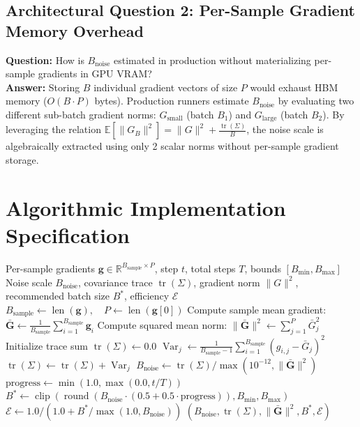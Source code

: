 \documentclass[11pt,a4paper]{article}
\theoremstyle{definition}
\begin{document}
\subsection{Architectural Question 2: Per-Sample Gradient Memory Overhead}
\textbf{Question:} How is $B_{\text{noise}}$ estimated in production without materializing per-sample gradients in GPU VRAM?\\
\textbf{Answer:} Storing $B$ individual gradient vectors of size $P$ would exhaust HBM memory ($O(B \cdot P)$ bytes). Production runners estimate $B_{\text{noise}}$ by evaluating two different sub-batch gradient norms: $G_{\text{small}}$ (batch $B_1$) and $G_{\text{large}}$ (batch $B_2$). By leveraging the relation $\mathbb{E}[\|G_B\|^2] = \|G\|^2 + \frac{\operatorname{tr}(\Sigma)}{B}$, the noise scale is algebraically extracted using only 2 scalar norms without per-sample gradient storage.

\section{Algorithmic Implementation Specification}

\begin{algorithm}[H]
\caption{Critical Batch Size and Gradient Noise Scale Estimation}
\begin{algorithmic}[1]
\Require Per-sample gradients $\mathbf{g} \in \mathbb{R}^{B_{\text{sample}} \times P}$, step $t$, total steps $T$, bounds $[B_{\min}, B_{\max}]$
\Ensure Noise scale $B_{\text{noise}}$, covariance trace $\operatorname{tr}(\Sigma)$, gradient norm $\|G\|^2$, recommended batch size $B^*$, efficiency $\mathcal{E}$
\State $B_{\text{sample}} \gets \operatorname{len}(\mathbf{g}), \quad P \gets \operatorname{len}(\mathbf{g}[0])$
\State Compute sample mean gradient: $\bar{\mathbf{G}} \gets \frac{1}{B_{\text{sample}}} \sum_{i=1}^{B_{\text{sample}}} \mathbf{g}_i$
\State Compute squared mean norm: $\|\bar{\mathbf{G}}\|^2 \gets \sum_{j=1}^P \bar{G}_j^2$
\State Initialize trace sum $\operatorname{tr}(\Sigma) \gets 0.0$
    \State $\operatorname{Var}_j \gets \frac{1}{B_{\text{sample}} - 1} \sum_{i=1}^{B_{\text{sample}}} (g_{i, j} - \bar{G}_j)^2$
    \State $\operatorname{tr}(\Sigma) \gets \operatorname{tr}(\Sigma) + \operatorname{Var}_j$
\EndFor
\State $B_{\text{noise}} \gets \operatorname{tr}(\Sigma) / \max(10^{-12}, \|\bar{\mathbf{G}}\|^2)$
\State $\text{progress} \gets \min(1.0, \max(0.0, t / T))$
\State $B^* \gets \operatorname{clip}\left( \operatorname{round}\left( B_{\text{noise}} \cdot (0.5 + 0.5 \cdot \text{progress}) \right), B_{\min}, B_{\max} \right)$
\State $\mathcal{E} \gets 1.0 / (1.0 + B^* / \max(1.0, B_{\text{noise}}))$
\State \Return $(B_{\text{noise}}, \operatorname{tr}(\Sigma), \|\bar{\mathbf{G}}\|^2, B^*, \mathcal{E})$
\end{algorithmic}
\end{algorithm}
\end{document}
